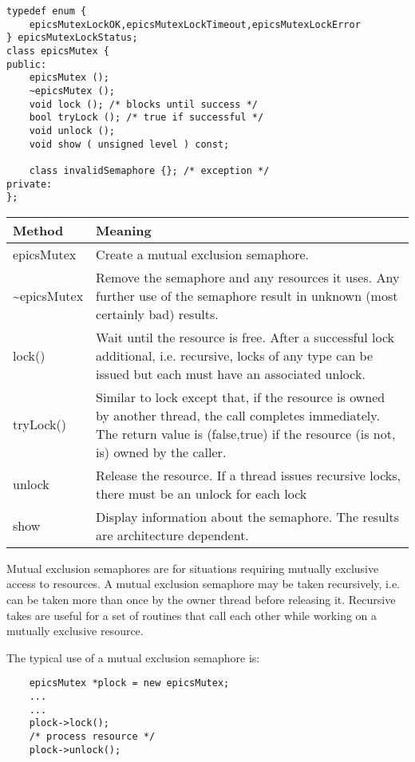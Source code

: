 \begin{verbatim}typedef enum {
    epicsMutexLockOK,epicsMutexLockTimeout,epicsMutexLockError
} epicsMutexLockStatus;
class epicsMutex {
public:
    epicsMutex ();
    ~epicsMutex ();
    void lock (); /* blocks until success */
    bool tryLock (); /* true if successful */
    void unlock ();
    void show ( unsigned level ) const;

    class invalidSemaphore {}; /* exception */
private:
};\end{verbatim}
\begin{center}\begin{longtable}{p{1.38889in}p{5.0in}}
\textbf{Method} & \textbf{Meaning}\\
\hline
epicsMutex & Create a mutual exclusion semaphore.\\
\~{}epicsMutex & Remove the semaphore and any resources it uses. Any further use of the semaphore result in unknown (most certainly bad) results.\\
lock() & Wait until the resource is free. After a successful lock additional, i.e. recursive, locks of any type can be issued but each must have an associated unlock.\\
tryLock() & Similar to lock except that, if the resource is owned by another thread, the call completes immediately. The return value is (false,true) if the resource (is not, is) owned by the caller.\\
unlock & Release the resource. If a thread issues recursive locks, there must be an unlock for each lock\\
show & Display information about the semaphore. The results are architecture dependent.
\end{longtable}\end{center}


Mutual exclusion semaphores are for situations requiring mutually exclusive access to resources. A mutual exclusion 
semaphore may be taken recursively, i.e. can be taken more than once by the owner thread before releasing it. Recursive 
takes are useful for a set of routines that call each other while working on a mutually exclusive resource.

The typical use of a mutual exclusion semaphore is:

\begin{verbatim}    epicsMutex *plock = new epicsMutex;
    ...
    ...
    plock->lock();
    /* process resource */
    plock->unlock();
\end{verbatim}

